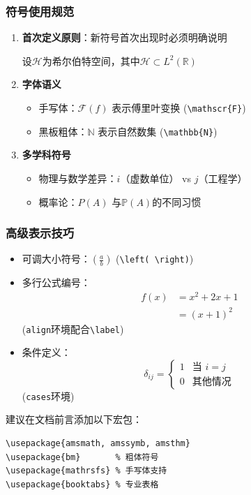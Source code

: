 \subsubsection{符号使用规范}
\begin{enumerate}
    \item \textbf{首次定义原则}：新符号首次出现时必须明确说明
    \begin{itemize}
        设$\mathcal{H}$为希尔伯特空间，其中$\mathcal{H} \subset L^2(\mathbb{R})$
    \end{itemize}

    \item \textbf{字体语义}
    \begin{itemize}
        \item 手写体：$\mathscr{F}(f)$ 表示傅里叶变换 (\verb|\mathscr{F}|)
        \item 黑板粗体：$\mathbb{N}$ 表示自然数集 (\verb|\mathbb{N}|)
    \end{itemize}

    \item \textbf{多学科符号}
    \begin{itemize}
        \item 物理与数学差异：$i$（虚数单位） vs $j$（工程学）
        \item 概率论：$P(A)$ 与$\mathbb{P}(A)$的不同习惯
    \end{itemize}
\end{enumerate}

\subsubsection{高级表示技巧}
\begin{itemize}
    \item 可调大小符号：$\left( \frac{a}{b} \right)$ (\verb|\left( \right)|)
    \item 多行公式编号：
    \begin{align}
        f(x) &= x^2 + 2x + 1 \label{eq:1} \\
             &= (x+1)^2 \label{eq:2}
    \end{align}
    (\verb|align|环境配合\verb|\label|)

    \item 条件定义：
    \[
        \delta_{ij} = \begin{cases}
        1 & \text{当 } i = j \\
        0 & \text{其他情况}
        \end{cases}
    \]
    (\verb|cases|环境)
\end{itemize}

建议在文档前言添加以下宏包：
\begin{verbatim}
\usepackage{amsmath, amssymb, amsthm}
\usepackage{bm}       % 粗体符号
\usepackage{mathrsfs} % 手写体支持
\usepackage{booktabs} % 专业表格
\end{verbatim}